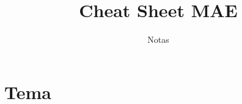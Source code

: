 \documentclass{article}
\title{Cheat Sheet MAE}
\author{Notas}
\date{}
\begin{document}
\maketitle

\section*{Tema}
\end{document}
